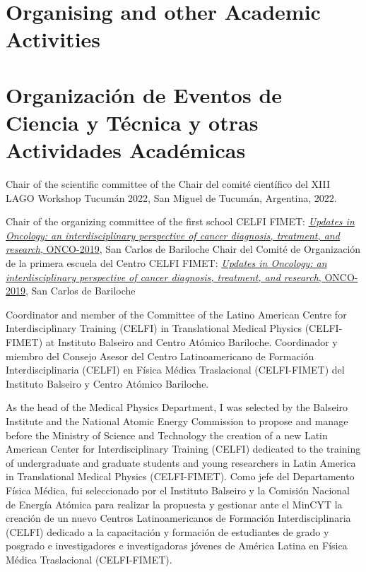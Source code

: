 \ifeng
\section*{Organising and other Academic Activities}
\else
\section*{Organización de Eventos de Ciencia y Técnica y otras Actividades Académicas}
\fi

\ifeng
Chair of the scientific committee of the
\else
Chair del comité científico del
\fi
XIII LAGO Workshop Tucumán 2022, San Miguel de Tucumán, Argentina, 2022.

\ifeng
Chair of the organizing committee of the first school CELFI FIMET: \href{https://fisica.cab.cnea.gov.ar/fisicamedica/celfi-oncology/}{{\emph{Updates in Oncology: an interdisciplinary perspective of cancer diagnosis, treatment, and research}}, ONCO-2019}, San Carlos de Bariloche
\else
Chair del Comité de Organización de la primera escuela del Centro CELFI FIMET: \href{https://fisica.cab.cnea.gov.ar/fisicamedica/celfi-oncology/}{{\emph{Updates in Oncology: an interdisciplinary perspective of cancer diagnosis, treatment, and research}}, ONCO-2019}, San Carlos de Bariloche
\fi

\ifeng
Coordinator and member of the Committee of the Latino American Centre for Interdisciplinary Training (CELFI) in Translational Medical Physics (CELFI-FIMET) at Instituto Balseiro and Centro Atómico Bariloche.
\else
Coordinador y miembro del Consejo Asesor del Centro Latinoamericano de Formación Interdisciplinaria (CELFI) en Física Médica Traslacional (CELFI-FIMET) del Instituto Balseiro y Centro Atómico Bariloche.
\fi

\ifeng
As the head of the Medical Physics Department, I was selected by the Balseiro Institute and the National Atomic Energy Commission to propose and manage before the Ministry of Science and Technology the creation of a new Latin American Center for Interdisciplinary Training (CELFI) dedicated to the training of undergraduate and graduate students and young researchers in Latin America in Translational Medical Physics (CELFI-FIMET).
\else
Como jefe del Departamento Física Médica, fui seleccionado por el Instituto Balseiro y la Comisión Nacional de Energía Atómica para realizar la propuesta y gestionar ante el MinCYT la creación de un nuevo Centros Latinoamericanos de Formación Interdisciplinaria (CELFI) dedicado a la capacitación y formación de estudiantes de grado y posgrado e investigadores e investigadoras jóvenes de América Latina en Física Médica Traslacional (CELFI-FIMET).
\fi

